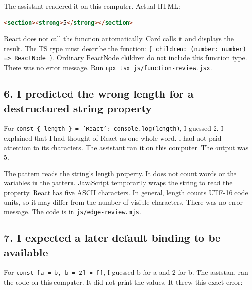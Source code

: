 \documentclass[
  10pt,
  a4paper,
]{article}
\begin{document}

The assistant rendered it on this computer. Actual HTML:

\begin{minipage}{\linewidth}

\begin{lstlisting}[language=HTML]
<section><strong>5</strong></section>
\end{lstlisting}

\end{minipage}\par

React does not call the function automatically. Card calls it and
displays the result. The TS type must describe the function:
\texttt{\{ children:\allowbreak{} (number:\allowbreak{} number) => ReactNode \}}.
Ordinary ReactNode children do not include this function type. There was
no error message. Run
\texttt{npx tsx js/\allowbreak{}function-review.\allowbreak{}jsx}.

\subsection{6. I predicted the wrong length for a destructured string
property}\label{i-predicted-the-wrong-length-for-a-destructured-string-property}

For
\texttt{const \{ length \} = 'React'; console.\allowbreak{}log(length)},
I guessed 2. I explained that I had thought of React as one whole word.
I had not paid attention to its characters. The assistant ran it on this
computer. The output was 5.

The pattern reads the string's length property. It does not count words
or the variables in the pattern. JavaScript temporarily wraps the string
to read the property. React has five ASCII characters. In general,
length counts UTF-16 code units, so it may differ from the number of
visible characters. There was no error message. The code is in
\texttt{js/\allowbreak{}edge-review.\allowbreak{}mjs}.

\subsection{7. I expected a later default binding to be
available}\label{i-expected-a-later-default-binding-to-be-available}

For \texttt{const [a = b, b = 2] = []}, I guessed b for a and 2 for b.
The assistant ran the code on this computer. It did not print the
values. It threw this exact error:
\end{document}
